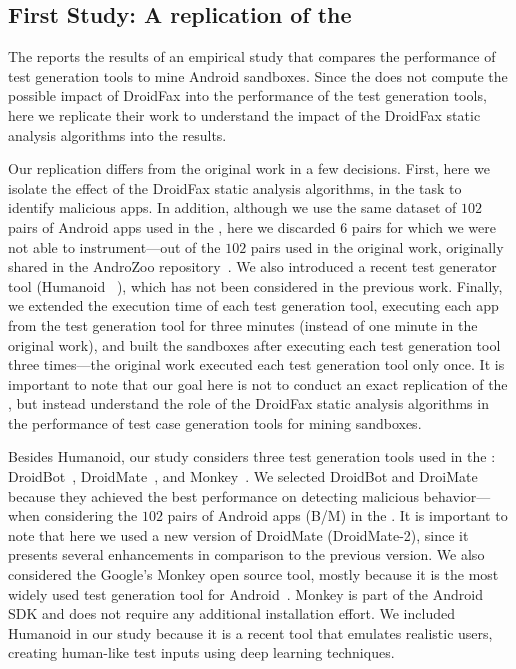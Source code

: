 \subsection{First Study: A replication of the \blls}\label{sec:set1}

The \blls reports the results of an empirical study that compares the performance of test generation tools to mine Android
sandboxes. Since the \blls does not
compute the possible impact of DroidFax into the performance of the test generation tools,
here we replicate their work to understand the impact of the DroidFax static analysis algorithms into the \blls results.

Our replication differs from the original work in a few decisions. First, here we isolate
the effect of the DroidFax static analysis algorithms, in the task to identify malicious apps. In addition, although we use the same dataset of
$102$ pairs of Android apps used in the \blls, here we discarded $6$ pairs for which
we were not able to instrument---out of the $102$ pairs used in the original work, originally shared in the AndroZoo repository~\cite{DBLP:conf/msr/AllixBKT16}. We also introduced a recent test generator tool (Humanoid ~\cite{DBLP:conf/kbse/LiY0C19}), which
has not been considered in the previous work. Finally, we extended the execution time of each test generation tool,
executing each app from the test generation tool for three minutes (instead of one minute in the
original work),
and built the sandboxes after executing each test generation tool
three times---the original work executed each test generation tool
only once. It is important to note that our goal here is not to conduct an
exact replication of the \blls, but instead understand
the role of the DroidFax static analysis algorithms in the
performance of test case generation tools for mining sandboxes.

Besides Humanoid, our study considers three test generation tools used in the \blls: DroidBot~\cite{DBLP:conf/icse/LiYGC17},
DroidMate~\cite{DBLP:conf/icse/JamrozikZ16}, and Monkey~\cite{Monkey}. We selected DroidBot and DroiMate because they achieved
the best performance on detecting malicious behavior---when considering the $102$ pairs of Android apps (B/M) in the \blls.
It is important to note that here we used a new version of DroidMate (DroidMate-2), since it presents several enhancements
in comparison to the previous version. We also considered the Google's Monkey open source tool, mostly because it is the most
widely used test generation tool for Android~\cite{DBLP:conf/sigsoft/ZengLZXDLYX16}. Monkey is part of the Android SDK
and does not require any additional installation effort. We included Humanoid in our study
because it is a recent tool that emulates realistic users, creating human-like test inputs using deep learning techniques.

